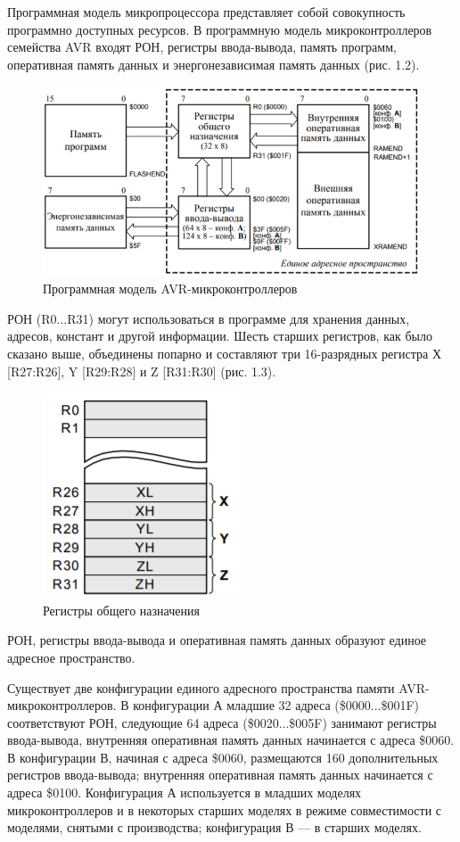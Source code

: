 \documentclass[12pt, oneside]{altsu-report}
\begin{document}
Программная модель микропроцессора представляет собой совокупность программно доступных ресурсов. В программную модель микроконтроллеров семейства AVR входят РОН, регистры ввода-вывода, память программ, оперативная память данных и энергонезависимая память данных (рис. 1.2).~\cite{AVR}

\begin{figure}[!ht]
    \centering
    \includegraphics{Program_model_AVR.png}
    \caption{Программная модель AVR-микроконтроллеров}
    \label{fig:program_model}
\end{figure}

РОН (R0...R31) могут использоваться в программе для хранения данных, адресов, констант и другой информации. Шесть старших регистров, как было сказано выше, объединены попарно и составляют три 16-разрядных регистра Х [R27:R26], Y [R29:R28] и Z [R31:R30] (рис. 1.3). 

\begin{figure}[!ht]
    \centering
    \includegraphics{General_registers.png}
    \caption{Регистры общего назначения}
    \label{fig:gr_avr}
\end{figure}

РОН, регистры ввода-вывода и оперативная память данных образуют единое адресное пространство.

Существует две конфигурации единого адресного пространства памяти AVR-микро\-контроллеров. В конфигурации А младшие 32 адреса (\$0000...\$001F) соответствуют РОН, следующие 64 адреса (\$0020...\$005F) занимают регистры ввода-вывода, внутренняя оперативная память данных начинается с адреса \$0060. В конфигурации В, начиная с адреса \$0060, размещаются 160 дополнительных регистров ввода-вывода; внутренняя оперативная память данных начинается с адреса \$0100. Конфигурация А используется в младших моделях микроконтроллеров и в некоторых старших моделях в режиме совместимости с моделями, снятыми с производства; конфигурация В --- в старших моделях.
\end{document}
